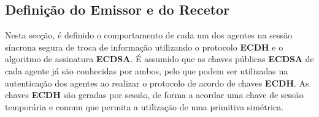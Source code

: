 \documentclass[11pt]{article}
\begin{document}
    \hypertarget{definiuxe7uxe3o-do-emissor-e-do-recetor}{%
\subsection{Definição do Emissor e do
Recetor}\label{definiuxe7uxe3o-do-emissor-e-do-recetor}}

    Nesta secção, é definido o comportamento de cada um dos agentes na
sessão síncrona segura de troca de informação utilizando o protocolo
\textbf{ECDH} e o algoritmo de assinatura \textbf{ECDSA}. É assumido que
as chaves públicas \textbf{ECDSA} de cada agente já são conhecidas por
ambos, pelo que podem ser utilizadas na autenticação dos agentes ao
realizar o protocolo de acordo de chaves \textbf{ECDH}. As chaves
\textbf{ECDH} são geradas por sessão, de forma a acordar uma chave de
sessão temporária e comum que permita a utilização de uma primitiva
simétrica.
\end{document}
